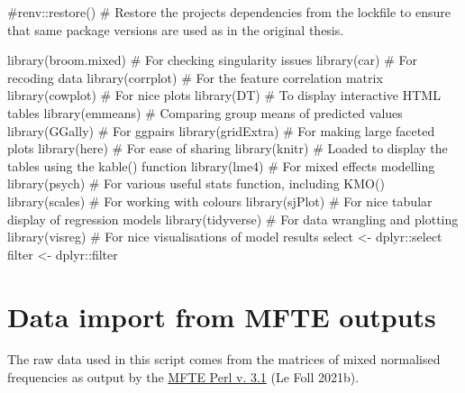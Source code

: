 \documentclass[
  letterpaper,
  DIV=11,
  numbers=noendperiod]{scrreprt}
\newenvironment{Shaded}{\begin{snugshade}}{\end{snugshade}}
\newcommand{\CommentTok}[1]{\textcolor[rgb]{0.37,0.37,0.37}{#1}}
\newcommand{\FunctionTok}[1]{\textcolor[rgb]{0.28,0.35,0.67}{#1}}
\newcommand{\NormalTok}[1]{\textcolor[rgb]{0.00,0.23,0.31}{#1}}
\newcommand{\OtherTok}[1]{\textcolor[rgb]{0.00,0.23,0.31}{#1}}
\newcommand{\SpecialCharTok}[1]{\textcolor[rgb]{0.37,0.37,0.37}{#1}}
\begin{document}
\begin{Shaded}
\begin{Highlighting}[]
\CommentTok{\#renv::restore() \# Restore the project\textquotesingle{}s dependencies from the lockfile to ensure that same package versions are used as in the original thesis.}

\FunctionTok{library}\NormalTok{(broom.mixed) }\CommentTok{\# For checking singularity issues }
\FunctionTok{library}\NormalTok{(car) }\CommentTok{\# For recoding data}
\FunctionTok{library}\NormalTok{(corrplot) }\CommentTok{\# For the feature correlation matrix}
\FunctionTok{library}\NormalTok{(cowplot) }\CommentTok{\# For nice plots}
\FunctionTok{library}\NormalTok{(DT) }\CommentTok{\# To display interactive HTML tables}
\FunctionTok{library}\NormalTok{(emmeans) }\CommentTok{\# Comparing group means of predicted values}
\FunctionTok{library}\NormalTok{(GGally) }\CommentTok{\# For ggpairs}
\FunctionTok{library}\NormalTok{(gridExtra) }\CommentTok{\# For making large faceted plots}
\FunctionTok{library}\NormalTok{(here) }\CommentTok{\# For ease of sharing}
\FunctionTok{library}\NormalTok{(knitr) }\CommentTok{\# Loaded to display the tables using the kable() function}
\FunctionTok{library}\NormalTok{(lme4) }\CommentTok{\# For mixed effects modelling}
\FunctionTok{library}\NormalTok{(psych) }\CommentTok{\# For various useful stats function, including KMO()}
\FunctionTok{library}\NormalTok{(scales) }\CommentTok{\# For working with colours}
\FunctionTok{library}\NormalTok{(sjPlot) }\CommentTok{\# For nice tabular display of regression models}
\FunctionTok{library}\NormalTok{(tidyverse) }\CommentTok{\# For data wrangling and plotting}
\FunctionTok{library}\NormalTok{(visreg) }\CommentTok{\# For nice visualisations of model results}
\NormalTok{select }\OtherTok{\textless{}{-}}\NormalTok{ dplyr}\SpecialCharTok{::}\NormalTok{select}
\NormalTok{filter }\OtherTok{\textless{}{-}}\NormalTok{ dplyr}\SpecialCharTok{::}\NormalTok{filter}
\end{Highlighting}
\end{Shaded}

\section{Data import from MFTE
outputs}\label{data-import-from-mfte-outputs}

The raw data used in this script comes from the matrices of mixed
normalised frequencies as output by the
\href{https://github.com/mshakirDr/MultiFeatureTaggerEnglish}{MFTE Perl
v. 3.1} (Le Foll 2021b).
\end{document}

